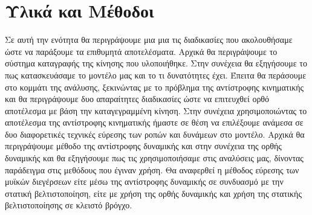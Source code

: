 \chapter{Υλικά και Μέθοδοι}

Σε αυτή την ενότητα θα περιγράψουμε μια μια τις διαδικασίες που ακολουθήσαμε ώστε να παράξουμε τα επιθυμητά αποτελέσματα. Αρχικά θα περιγράψουμε το σύστημα καταγραφής της κίνησης που υλοποιήθηκε. Στην συνέχεια θα εξηγήσουμε το πως κατασκευάσαμε το μοντέλο μας και το τι δυνατότητες έχει. Έπειτα θα περάσουμε στο κομμάτι της ανάλυσης, ξεκινώντας με το πρόβλημα της αντίστροφης κινηματικής και θα περιγράψουμε δυο απαραίτητες διαδικασίες ώστε να επιτευχθεί ορθό αποτέλεσμα με βάση την καταγεγραμμένη κίνηση. Στην συνέχεια χρησιμοποιώντας το αποτέλεσμα της αντίστροφης κινηματικής ήμαστε σε θέση να επιλέξουμε ανάμεσα σε δυο διαφορετικές τεχνικές εύρεσης των ροπών και δυνάμεων στο μοντέλο. Αρχικά θα περιγράψουμε μέθοδο της αντίστροφης δυναμικής και στην συνέχεια της ορθής δυναμικής και θα εξηγήσουμε πως τις χρησιμοποιήσαμε στις αναλύσεις μας, δίνοντας παράδειγμα στις μεθόδους που έγιναν χρήση. Θα αναφερθεί η μέθοδος εύρεσης των μυϊκών διεγέρσεων είτε μέσω της αντίστροφης δυναμικής σε συνδυασμό με την στατική βελτιστοποίηση, είτε με χρήση της ορθής δυναμικής και χρήση της στατικής βελτιστοποίησης σε κλειστό βρόγχο.

%

